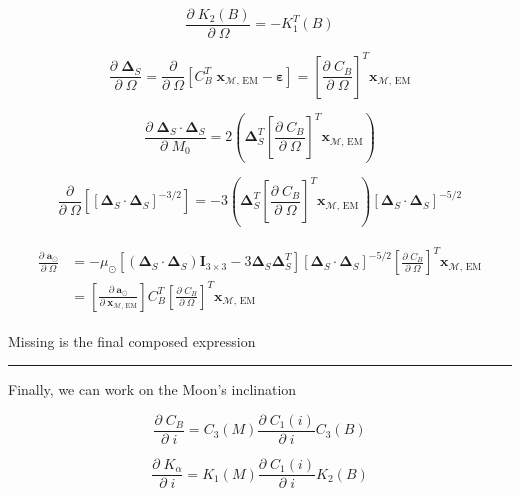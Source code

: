 \documentclass[]{article}
\newcommand{\pd}[2]{\frac{\partial\;#1}{\partial\;#2}}
\newcommand{\pddown}[2]{\frac{\partial}{\partial\;#2} \left[ #1 \right] }
\begin{document}
	\begin{equation*}
		\pd{K_2(B)}{\Omega} = -K_1^T(B)
	\end{equation*}
	
	\begin{equation*}
		\pd{\boldsymbol{\Delta}_S}{\Omega} = \pddown{C_B^T \; \mathbf{x}_{\mathcal{M}\text{, EM}} - \boldsymbol{\varepsilon}}{\Omega} = \left[ \pd{C_B}{\Omega} \right]^T \mathbf{x}_{\mathcal{M}\text{, EM}}
	\end{equation*}
	
	\begin{equation*}
		\pd{\boldsymbol{\Delta}_S \cdot \boldsymbol{\Delta}_S}{M_0} = 2\left( \boldsymbol{\Delta}_S^T \left[ \pd{C_B}{\Omega} \right]^T \mathbf{x}_{\mathcal{M}\text{, EM}} \right)
	\end{equation*}
	
	\begin{equation*}
		\pddown{ [\boldsymbol{\Delta}_S \cdot \boldsymbol{\Delta}_S]^{-3/2} }{\Omega} = -3 \left( \boldsymbol{\Delta}_S^T \left[ \pd{C_B}{\Omega} \right]^T \mathbf{x}_{\mathcal{M}\text{, EM}} \right) [\boldsymbol{\Delta}_S \cdot \boldsymbol{\Delta}_S]^{-5/2}
	\end{equation*}
	
	\begin{align}
	\begin{split}
		\pd{\mathbf{a}_{\odot}}{\Omega}
		&= -\mu_\odot \left[ (\boldsymbol{\Delta}_S \cdot \boldsymbol{\Delta}_S)\mathbf{I}_{3\times 3} - 3 \boldsymbol{\Delta}_S \boldsymbol{\Delta}_S^T \right] [\boldsymbol{\Delta}_S \cdot \boldsymbol{\Delta}_S]^{-5/2} \left[ \pd{C_B}{\Omega} \right]^T \mathbf{x}_{\mathcal{M}\text{, EM}} \\
		&= \left[\pd{\mathbf{a}_{\odot}}{ \mathbf{x}_{\mathcal{M}\text{, EM}} }\right] C_B^T \left[ \pd{C_B}{\Omega} \right]^T \mathbf{x}_{\mathcal{M}\text{, EM}}
	\end{split}
	\end{align}
	
	Missing is the final composed expression
	
	\hrule \vspace{1em}
	
	Finally, we can work on the Moon's inclination
	
	\begin{equation*}
		\pd{C_B}{i} = C_3(M) \pd{C_1(i)}{i} C_3(B)
	\end{equation*}
	
	\begin{equation*}
		\pd{K_\alpha}{i} = K_1(M) \pd{C_1(i)}{i} K_2(B)
	\end{equation*}
	
\end{document}
